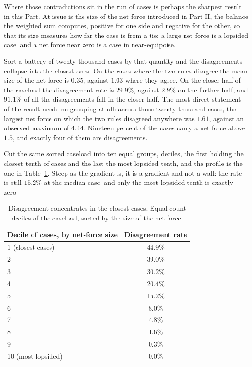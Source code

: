 Where those contradictions sit in the run of cases is perhaps the sharpest
result in this Part. At issue is the size of the net force introduced in Part
II, the balance the weighted sum computes, positive for one side and negative
for the other, so that its size measures how far the case is
from a tie: a large net force is a lopsided case, and a net force near
zero is a case in near-equipoise.

Sort a battery of twenty thousand cases by that quantity and the
disagreements collapse into the closest ones. On the cases where the two
rules disagree the mean size of the net force is $0.35$, against $1.03$
where they agree. On the closer half of the caseload the disagreement rate
is $29.9\%$, against $2.9\%$ on the farther half, and $91.1\%$ of all the
disagreements fall in the closer half. The most
direct statement of the result needs no grouping at all: across those
twenty thousand cases, the largest net force on which the two rules
disagreed anywhere was $1.61$, against an observed maximum of $4.44$.
Nineteen percent of the cases carry a net force above $1.5$, and exactly
four of them are disagreements.

Cut the same sorted caseload into ten equal groups, deciles, the first
holding the closest tenth of cases and the last the most lopsided tenth,
and the profile is the one in Table~\ref{tab:closeness}. Steep as the gradient is, it is a gradient and not a wall: the rate is
still $15.2\%$ at the median case, and only the most lopsided tenth is
exactly zero.

\begin{table}[t]
\centering
\small
\caption{Disagreement concentrates in the closest cases. Equal-count
deciles of the caseload, sorted by the size of the net force.}
\label{tab:closeness}
\begin{tabular}{lc}
\toprule
\textbf{Decile of cases, by net-force size} & \textbf{Disagreement rate} \\
\midrule
1 (closest cases)  & $44.9\%$ \\
2                  & $39.0\%$ \\
3                  & $30.2\%$ \\
4                  & $20.4\%$ \\
5                  & $15.2\%$ \\
6                  & $8.0\%$ \\
7                  & $4.8\%$ \\
8                  & $1.6\%$ \\
9                  & $0.3\%$ \\
10 (most lopsided) & $0.0\%$ \\
\bottomrule
\end{tabular}
\end{table}

